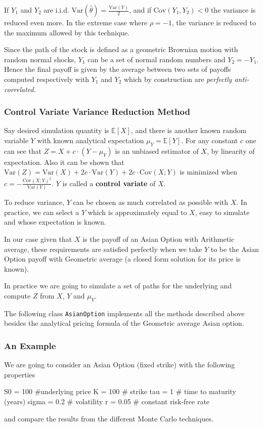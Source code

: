 If $Y_1$ and $Y_2$ are i.i.d. $\text{Var}(\hat{\theta})=\frac{\text{Var}(Y)}{2}$, and if $\text{Cov}(Y_1, Y_2)<0$ the variance is reduced even more. In the extreme case where $\rho=-1$, the variance is reduced to the maximum allowed by this technique. 

Since the path of the stock is defined as a geometric Brownian motion with random normal shocks, $Y_1$ can be a set of normal random numbers and $Y_2 = -Y_1$. Hence the final payoff is given by the average between two sets of payoffs computed respectively with $Y_1$ and $Y_2$ which by construction are \emph{perfectly anti-correlated}. 

\subsubsection{Control Variate Variance Reduction Method}

Say desired simulation quantity is $\mathbb{E}[X]$, and there is another known random variable $Y$ with known analytical expectation $\mu_Y = \mathbb{E}[Y]$. For any constant $c$ one can see that $Z = X + c\cdot(Y -\mu_Y)$ is an unbiased estimator of $X$, by linearity of expectation. Also it can be shown that $\text{Var}(Z) = \text{Var}(X) + 2c\cdot \text{Var}(Y) + 2c\cdot\text{Cov}(X; Y)$ is minimized when $c = -\frac{\text{Cov}(X;Y)^2}{\text{Var}(Y)}$. 
$Y$ is called a \textbf{control variate} of $X$. 

To reduce variance, $Y$ can be chosen as much correlated as possible with $X$. In practice, we can select a $Y$ which is approximately equal to $X$, easy to simulate and whose expectation is known. 

In our case given that $X$ is the payoff of an Asian Option with Arithmetic average, these requirements are satisfied perfectly when we take $Y$ to be the Asian Option payoff with Geometric average (a closed form solution for its price is known).

In practice we are going to simulate a set of paths for the underlying and compute $Z$ from  $X$, $Y$ and $\mu_Y$.

\begin{finmarkets}
The following class \texttt{AsianOption} implements all the methods described above besides the analytical pricing formula of the Geometric average Asian option.
\end{finmarkets}


\subsubsection{An Example}
We are going to consider an Asian Option (fixed strike) with the following properties
\begin{ipython}
S0 = 100 #underlying price
K = 100 # strike
tau = 1 # time to maturity (years)
sigma = 0.2 # volatility
r = 0.05 # constant risk-free rate
\end{ipython}
and compare the results from the different Monte Carlo techniques.

